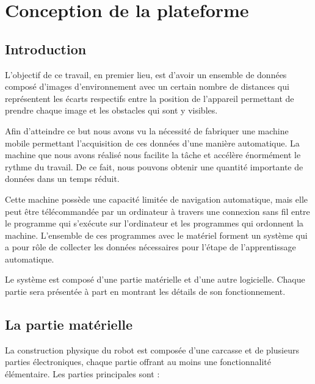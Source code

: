 \setcounter{chapter}{2} %

\chapter{Conception de la plateforme}

\section{Introduction}

L'objectif de ce travail, en premier lieu, est d'avoir un ensemble de données
composé d'images d'environnement avec un certain nombre de distances qui
représentent  les écarts respectifs entre la position de l'appareil permettant
de prendre chaque image et les obstacles qui sont y visibles.

Afin d'atteindre ce but nous avons vu la nécessité de fabriquer une machine mobile
permettant l'acquisition de ces données d'une manière automatique. La machine que
nous avons réalisé nous facilite la tâche et accélère énormément le rythme du travail.
De ce fait, nous pouvons obtenir une quantité importante de données dans un temps
réduit.

Cette machine possède une capacité limitée de navigation automatique, mais
elle peut être télécommandée par un ordinateur à travers une connexion sans fil
entre le programme qui s'exécute sur l'ordinateur et les programmes qui ordonnent
la machine. L'ensemble de ces programmes avec le matériel forment un système
qui a pour rôle de collecter les données nécessaires pour l'étape de
l'apprentissage automatique.

Le système est composé d'une partie matérielle et d'une autre logicielle. Chaque
partie sera présentée à part en montrant les détails de son fonctionnement.

\section{La partie matérielle}

La construction physique du robot est composée d'une carcasse et de plusieurs
parties électroniques, chaque partie offrant au moins une fonctionnalité
élémentaire. Les parties principales sont :

